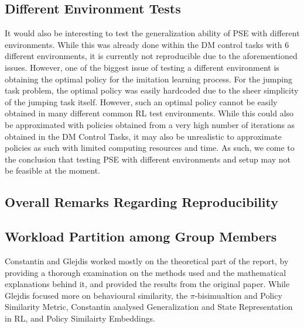 \documentclass{usiinftr}
\begin{document}
\subsection{Different Environment Tests}
It would also be interesting to test the generalization ability of PSE with different environments. While this was already done within the DM control tasks with 6 different environments, it is currently not reproducible due to the aforementioned issues. However, one of the biggest issue of testing a different environment is obtaining the optimal policy for the imitation learning process. For the jumping task problem, the optimal policy was easily hardcoded due to the sheer simplicity of the jumping task itself. However, such an optimal policy cannot be easily obtained in many different common RL test environments. While this could also be approximated with policies obtained from a very high number of iterations as obtained in the DM Control Tasks, it may also be unrealistic to approximate policies as such with limited computing resources and time. As such, we come to the conclusion that testing PSE with different environments and setup may not be feasible at the moment. 
\subsection{Overall Remarks Regarding Reproducibility}
\subsection{Workload Partition among Group Members}
Constantin and Glejdis worked mostly on the theoretical part of the report, by providing a thorough examination on the methods used and the mathematical explanations behind it, and provided the results from the original paper. While Glejdis focused more on behavioural similarity, the $\pi$-bisimualtion and Policy Similarity Metric, Constantin analysed Generalization and State Representation in RL, and Policy Similairty Embeddings. 


\end{document}
